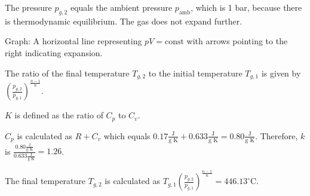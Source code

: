 The pressure \( p_{g,2} \) equals the ambient pressure \( p_{\text{amb}} \), which is 1 bar, because there is thermodynamic equilibrium. The gas does not expand further.

Graph: A horizontal line representing \( pV = \text{const} \) with arrows pointing to the right indicating expansion.

The ratio of the final temperature \( T_{g,2} \) to the initial temperature \( T_{g,1} \) is given by \( \left( \frac{p_{g,2}}{p_{g,1}} \right)^{\frac{n-1}{n}} \).

\( K \) is defined as the ratio of \( C_p \) to \( C_v \).

\( C_p \) is calculated as \( R + C_v \) which equals \( 0.17 \frac{\text{J}}{\text{g K}} + 0.633 \frac{\text{J}}{\text{g K}} = 0.80 \frac{\text{J}}{\text{g K}} \). Therefore, \( k \) is \( \frac{0.80 \frac{\text{J}}{\text{g K}}}{0.633 \frac{\text{J}}{\text{g K}}} = 1.26 \).

The final temperature \( T_{g,2} \) is calculated as \( T_{g,1} \left( \frac{p_{g,2}}{p_{g,1}} \right)^{\frac{n-1}{n}} = 446.13^\circ \text{C} \).